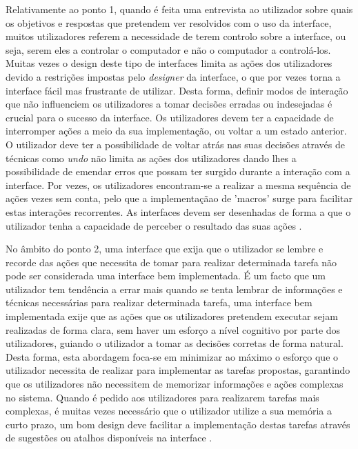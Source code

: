Relativamente ao ponto 1, quando é feita uma entrevista ao utilizador sobre quais os objetivos e respostas que pretendem ver resolvidos com o uso da interface, muitos utilizadores referem a necessidade de terem controlo sobre a interface, ou seja, serem eles a controlar o computador e não o computador a controlá-los. Muitas vezes o design deste tipo de interfaces limita as ações dos utilizadores devido a restrições impostas pelo \textit{designer} da interface, o que por vezes torna a interface fácil mas frustrante de utilizar. Desta forma, definir modos de interação que não influenciem os utilizadores a tomar decisões erradas ou indesejadas é crucial para o sucesso da interface. Os utilizadores devem ter a capacidade de interromper ações a meio da sua implementação, ou voltar a um estado anterior. O utilizador deve ter a possibilidade de voltar atrás nas suas decisões através de técnicas como \textit{undo} não limita as ações dos utilizadores dando lhes a possibilidade de emendar erros que possam ter surgido durante a interação com a interface. Por vezes, os utilizadores encontram-se a realizar a mesma sequência de ações vezes sem conta, pelo que a implementaçãao de 'macros' surge para facilitar estas interações recorrentes. As interfaces devem ser desenhadas de forma a que o utilizador tenha a capacidade de perceber o resultado das suas ações \cite{sridevi2014user}.

No âmbito do ponto 2, uma interface que exija que o utilizador se lembre e recorde das ações que necessita de tomar para realizar determinada tarefa não pode ser considerada uma interface bem implementada. É um facto que um utilizador tem tendência a errar mais quando se tenta lembrar de informações e técnicas necessárias para realizar determinada tarefa, uma interface bem implementada exije que as ações que os utilizadores pretendem executar sejam realizadas de forma clara, sem haver um esforço a nível cognitivo por parte dos utilizadores, guiando o utilizador a tomar as decisões corretas de forma natural. Desta forma, esta abordagem foca-se em minimizar ao máximo o esforço que o utilizador necessita de realizar para implementar as tarefas propostas, garantindo que os utilizadores não necessitem de memorizar informações e ações complexas no sistema. Quando é pedido aos utilizadores para realizarem tarefas mais complexas, é muitas vezes necessário que o utilizador utilize a sua memória a curto prazo, um bom design deve facilitar a implementação destas tarefas através de sugestões ou atalhos disponíveis na interface \cite{sridevi2014user}.

